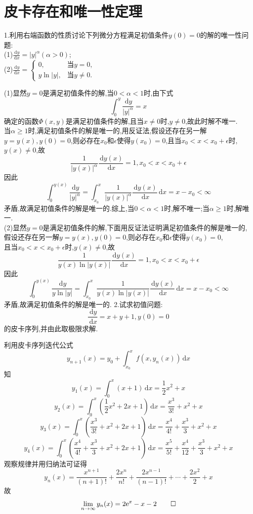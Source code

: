 \documentclass[titlepage,11pt,a4paper,twoside]{report}
\makeatletter
\newcommand\diff{\,\mathrm{d}}
\newcommand\e{\mathrm{e}}
\newenvironment{solve}{\par
	\pushQED{\qed}%
	\normalfont \topsep1\p@\@plus6\p@\relax
	\trivlist
	\item\relax
	{\hspace*{\parindent}{\heiti 解}\@addpunct{:}}\hspace\labelsep\ignorespaces
}{%
	\popQED\endtrivlist\@endpefalse
}
\makeatother
\begin{document}
\section{皮卡存在和唯一性定理}
1.利用右端函数的性质讨论下列微分方程满足初值条件$y(0)=0$的解的唯一性问题:\\
(1)$\frac{\diff y}{\diff x}=|y|^{\alpha}(\alpha>0)$;\\
(2)$\frac{\diff y}{\diff x}=\begin{cases}0,&\mbox{当}y=0,\\y\ln|y|,&\mbox{当}y\neq0.\end{cases}$
\begin{solve}(1)显然$y=0$是满足初值条件的解,当$0<\alpha<1$时,由下式
\[\int_0^y\frac{\diff y}{|y|^{\alpha}}=x\]
确定的函数$\varPhi(x,y)$是满足初值条件的解,且当$x\neq0$时,$y\neq0$,故此时解不唯一.\\
当$\alpha\geq1$时,满足初值条件的解是唯一的,用反证法,假设还存在另一解$y=y(x),y(0)=0$,则必存在$x_0$和$\epsilon$使得$y(x_0)=0$,且当$x_0<x<x_0+\epsilon$时,$y(x)\neq0$,故
\[\frac{1}{|y(x)|^{\alpha}}\frac{\diff y(x)}{\diff x}=1,x_0<x<x_0+\epsilon\]
因此\[\int_0^{y(x)}\frac{\diff y}{|y|^{\alpha}}=\int_{x_0}^x\frac{1}{|y(x)|^{\alpha}}\frac{\diff y(x)}{\diff x}\diff x=x-x_0<\infty\]
矛盾,故满足初值条件的解是唯一的.综上,当$0<\alpha<1$时,解不唯一;当$\alpha\geq1$时,解唯一.\\
(2)显然$y=0$是满足初值条件的解,下面用反证法证明满足初值条件的解是唯一的,假设还存在另一解$y=y(x),y(0)=0$,则必存在$x_0$和$\epsilon$使得$y(x_0)=0$,\\且当$x_0<x<x_0+\epsilon$时,$y(x)\neq0$,故
\[\frac{1}{y(x)\ln|y(x)|}\frac{\diff y(x)}{\diff x}=1,x_0<x<x_0+\epsilon\]
因此\[\int_0^{y(x)}\frac{\diff y}{y\ln|y|}=\int_{x_0}^x\frac{1}{y(x)\ln|y(x)|}\frac{\diff y(x)}{\diff x}\diff x=x-x_0<\infty\]
矛盾,故满足初值条件的解是唯一的.
\end{solve}
2.试求初值问题:\[\frac{\diff y}{\diff x}=x+y+1,y(0)=0\]
的皮卡序列,并由此取极限求解.
\begin{solve}利用皮卡序列迭代公式
\[y_{n+1}(x)=y_0+\int_{x_0}^xf(x,y_n(x))\diff x\]
知\[y_1(x)=\int_0^x(x+1)\diff x=\frac{1}{2}x^2+x\]
\[y_2(x)=\int_0^x\left(\frac{1}{2}x^2+2x+1\right)\diff x=\frac{x^3}{3!}+x^2+x\]
\[y_3(x)=\int_0^x\left(\frac{x^3}{3!}+x^2+2x+1\right)\diff x=\frac{x^4}{4!}+\frac{x^3}{3}+x^2+x\]
\[y_4(x)=\int_0^x\left(\frac{x^4}{4!}+\frac{x^3}{3}+x^2+2x+1\right)\diff x=\frac{x^5}{5!}+\frac{x^4}{12}+\frac{x^3}{3}+x^2+x\]
观察规律并用归纳法可证得
\[y_n(x)=\frac{x^{n+1}}{(n+1)!}+\frac{2x^n}{n!}+\frac{2x^{n-1}}{(n-1)!}+\cdots+\frac{2x^2}{2}+x\]
故\[\lim_{n\to\infty}y_n(x)=2\e^x-x-2\qedhere\]
\end{solve}
\end{document}
